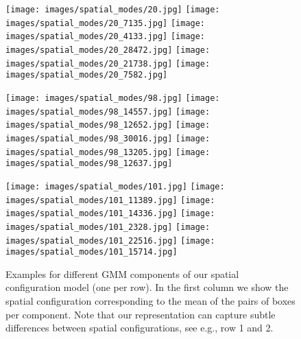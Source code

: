 \documentclass[10pt,twocolumn,letterpaper]{article}
\begin{document}
\begin{figure*}[t]
\centering
\begin{minipage}[b]{\textwidth}
       \texttt{[image: images/spatial\_modes/20.jpg]}
       \texttt{[image: images/spatial\_modes/20\_7135.jpg]}
       \texttt{[image: images/spatial\_modes/20\_4133.jpg]}
       \texttt{[image: images/spatial\_modes/20\_28472.jpg]}
       \texttt{[image: images/spatial\_modes/20\_21738.jpg]}
       \texttt{[image: images/spatial\_modes/20\_7582.jpg]}
       \vspace{-2ex}
	\end{minipage}   
	    
    \begin{minipage}[b]{\textwidth}   
       \texttt{[image: images/spatial\_modes/98.jpg]}
       \texttt{[image: images/spatial\_modes/98\_14557.jpg]}
       \texttt{[image: images/spatial\_modes/98\_12652.jpg]}
       \texttt{[image: images/spatial\_modes/98\_30016.jpg]}
       \texttt{[image: images/spatial\_modes/98\_13205.jpg]}
       \texttt{[image: images/spatial\_modes/98\_12637.jpg]}
\vspace{-1ex}
    \end{minipage}

\begin{minipage}[b]{\textwidth}
       \texttt{[image: images/spatial\_modes/101.jpg]}
       \texttt{[image: images/spatial\_modes/101\_11389.jpg]}
       \texttt{[image: images/spatial\_modes/101\_14336.jpg]}
       \texttt{[image: images/spatial\_modes/101\_2328.jpg]}
       \texttt{[image: images/spatial\_modes/101\_22516.jpg]}
       \texttt{[image: images/spatial\_modes/101\_15714.jpg]}
       \vspace{-0.5ex}
    \end{minipage}   
    \setlength\abovecaptionskip{0.3cm}
    \caption{Examples for different GMM components of our spatial configuration model (one
      per row). In the first column we show the spatial configuration
      corresponding to the mean of the pairs of boxes per
      component. Note that our representation can capture subtle
      differences between spatial configurations, see e.g., row 1 and 2.} 
      \vspace{-.4cm}
    \label{GMM_components}
\end{figure*}
\end{document}
